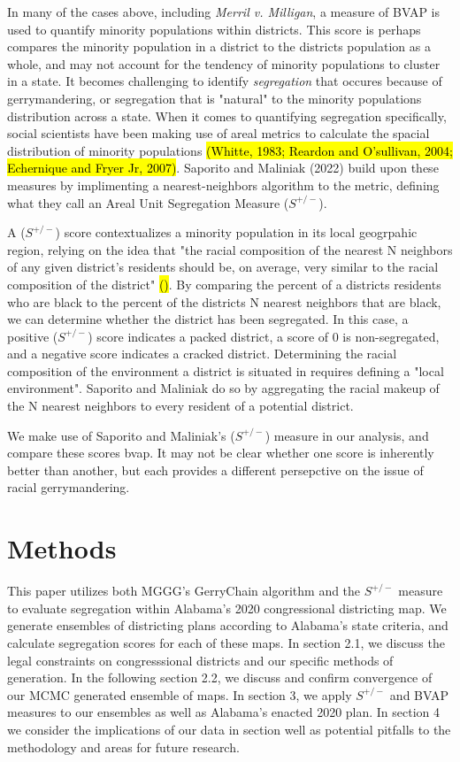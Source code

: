 \documentclass{article}
\begin{document}
In many of the cases above, including \emph{Merril v. Milligan}, a measure of BVAP is used to quantify minority populations within districts. This score is perhaps compares the minority population in a district to the districts population as a whole, and may not account for the tendency of minority populations to cluster in a state. It becomes challenging to identify \emph{segregation} that occures because of gerrymandering, or segregation that is "natural" to the minority populations distribution across a state. When it comes to quantifying segregation specifically, social scientists have been making use of areal metrics to calculate the spacial distribution of minority populations \hl{(Whitte, 1983; Reardon and O'sullivan, 2004; Echernique and Fryer Jr, 2007)}. Saporito and Maliniak (2022) build upon these measures by implimenting a nearest-neighbors algorithm to the metric, defining what they call an Areal Unit Segregation Measure ($S^{+/-}$).
\par
A ($S^{+/-}$) score contextualizes a minority population in its local geogrpahic region, relying on the idea that "the racial composition of the nearest N neighbors of any given district’s residents should be, on average, very similar to the racial composition of the district" \hl{()}. By comparing the percent of a districts residents who are black to the percent of the districts N nearest neighbors that are black, we can determine whether the district has been segregated. In this case, a positive ($S^{+/-}$) score indicates a packed district, a score of 0 is non-segregated, and a negative score indicates a cracked district. Determining the racial composition of the environment a district is situated in requires defining a "local environment". Saporito and Maliniak do so by aggregating the racial makeup of the N nearest neighbors to every resident of a potential district.
\par
We make use of Saporito and Maliniak's ($S^{+/-}$) measure in our analysis, and compare these scores bvap. It may not be clear whether one score is inherently better than another, but each provides a different persepctive on the issue of racial gerrymandering.

\section{Methods}\label{methods}
This paper utilizes both MGGG's GerryChain algorithm and the $S^{+/-}$ measure to evaluate segregation within Alabama's 2020 congressional districting map. We generate ensembles of districting plans according to Alabama's state criteria, and calculate segregation scores for each of these maps. In section 2.1, we discuss the legal constraints on congresssional districts and our specific methods of generation. In the following section 2.2, we discuss and confirm convergence of our MCMC generated ensemble of maps. In section 3, we apply $S^{+/-}$ and BVAP measures to our ensembles as well as Alabama's enacted 2020 plan. In section 4 we consider the implications of our data in section well as potential pitfalls to the methodology and areas for future research.
\end{document}
